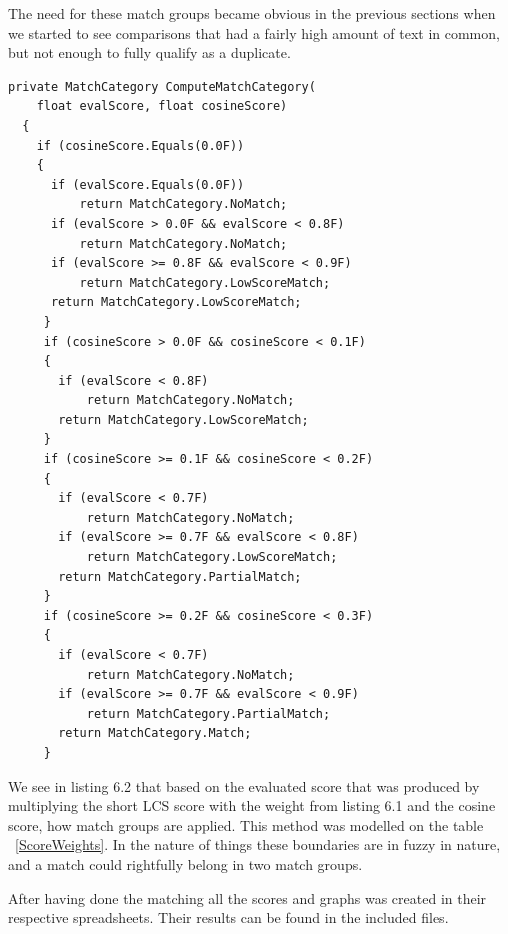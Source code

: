 The need for these match groups became obvious in the previous sections when we started to see comparisons that had a fairly high amount of text in common, but not enough to fully qualify as a duplicate. 


\lstset{style=sharpc}
\begin{lstlisting}[caption=Part of the method for applying Match Groups, captionpos=b]
private MatchCategory ComputeMatchCategory(
	float evalScore, float cosineScore)
  {
    if (cosineScore.Equals(0.0F))
    {
      if (evalScore.Equals(0.0F))
          return MatchCategory.NoMatch;
      if (evalScore > 0.0F && evalScore < 0.8F)
          return MatchCategory.NoMatch;
      if (evalScore >= 0.8F && evalScore < 0.9F)
          return MatchCategory.LowScoreMatch;
      return MatchCategory.LowScoreMatch;
     }
     if (cosineScore > 0.0F && cosineScore < 0.1F)
     {
       if (evalScore < 0.8F)
           return MatchCategory.NoMatch;
       return MatchCategory.LowScoreMatch;
     }
     if (cosineScore >= 0.1F && cosineScore < 0.2F)
     {
       if (evalScore < 0.7F)
           return MatchCategory.NoMatch;
       if (evalScore >= 0.7F && evalScore < 0.8F)
           return MatchCategory.LowScoreMatch;
       return MatchCategory.PartialMatch;
     }
     if (cosineScore >= 0.2F && cosineScore < 0.3F)
     {
       if (evalScore < 0.7F)
           return MatchCategory.NoMatch;
       if (evalScore >= 0.7F && evalScore < 0.9F)
           return MatchCategory.PartialMatch;
       return MatchCategory.Match;
     }
\end{lstlisting}

We see in listing 6.2 that based on the evaluated score that was produced by multiplying the short LCS score with the weight from listing 6.1 and the cosine score, how match groups are applied. This method was modelled on the table ~\ref{ScoreWeights}. In the nature of things these boundaries are in fuzzy in nature, and a match could rightfully belong in two match groups.

After having done the matching all the scores and graphs was created in their respective spreadsheets. Their results can be found in the included files.




